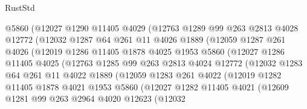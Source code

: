 \begin{lexlean}{RustStd}
\begin{coremodule}
{\begin{coremodule}
{{{{{{{{{{{{{{{{{{{{{{{{{{{{{                  @5860
                  (@12027
                    @1290
                    @11405
                    @4029
                    (@12763
                      @1289
                      @99
                      @263
                      @2813
                      @4028
                      @12772
                      (@12032
                        @1287
                        @64
                        @261
                        @11
                        @4026
                        @1889
                        (@12059
                          @1287
                          @261
                          @4026
                          (@12019
                            @1286
                            @11405
                            @1878
                            @4025
                            @1953
                            @5860
                            (@12027
                              @1286
                              @11405
                              @4025
                              (@12763
                                @1285
                                @99
                                @263
                                @2813
                                @4024
                                @12772
                                (@12032
                                  @1283
                                  @64
                                  @261
                                  @11
                                  @4022
                                  @1889
                                  (@12059
                                    @1283
                                    @261
                                    @4022
                                    (@12019
                                      @1282
                                      @11405
                                      @1878
                                      @4021
                                      @1953
                                      @5860
                                      (@12027
                                        @1282
                                        @11405
                                        @4021
                                        (@12609
                                          @1281
                                          @99
                                          @263
                                          @2964
                                          @4020
                                          @12623
                                          (@12032
}}}}}}}}}}}}}}}}}}}}}}}}}}}}}
\end{coremodule}}
\end{coremodule}
\end{lexlean}
